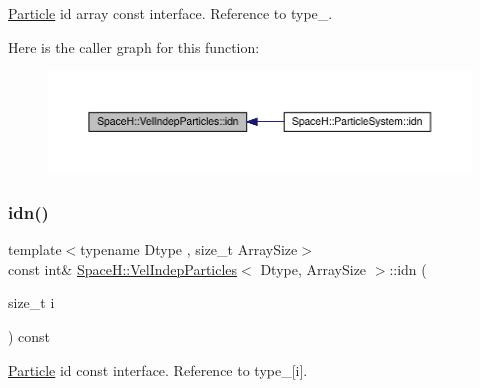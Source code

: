 \mbox{\hyperlink{struct_space_h_1_1_particle}{Particle}} id array const interface. Reference to type\+\_\+. 

Here is the caller graph for this function\+:
\nopagebreak
\begin{figure}[H]
\begin{center}
\leavevmode
\includegraphics[width=350pt]{class_space_h_1_1_vel_indep_particles_a6fde384478d19f53f0d325a8cda66ea5_icgraph}
\end{center}
\end{figure}
\mbox{\label{class_space_h_1_1_vel_indep_particles_a7753d4a30f9f62fe1acd51fbcdaf78c7}} 
\subsubsection{\texorpdfstring{idn()}{idn()}\hspace{0.1cm}{\footnotesize\ttfamily [2/2]}}
{\footnotesize\ttfamily template$<$typename Dtype , size\+\_\+t Array\+Size$>$ \\
const int\& \mbox{\hyperlink{class_space_h_1_1_vel_indep_particles}{Space\+H\+::\+Vel\+Indep\+Particles}}$<$ Dtype, Array\+Size $>$\+::idn (\begin{DoxyParamCaption}\item[{size\+\_\+t}]{i }\end{DoxyParamCaption}) const\hspace{0.3cm}{\ttfamily [inline]}}



\mbox{\hyperlink{struct_space_h_1_1_particle}{Particle}} id const interface. Reference to type\+\_\+\mbox{[}i\mbox{]}. 

\mbox{\label{class_space_h_1_1_vel_indep_particles_a9d8196bf1fe404e6c50ae20a11398076}} 
